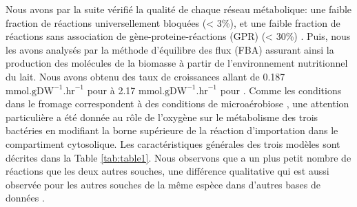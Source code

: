 Nous avons par la suite vérifié la qualité de chaque réseau métabolique: une faible fraction de réactions universellement bloquées (< 3\%), et une faible fraction de réactions sans association de gène-proteine-réactions (GPR) (< 30\%) \citep{Lieven.2020}. Puis, nous les avons analysés par la méthode d'équilibre des flux (FBA) \citep{Palsson1994,Orth2010} assurant ainsi la production des molécules de la biomasse à partir de l'environnement nutritionnel du lait. Nous avons obtenu des taux de croissances allant de 0.187 $\text{mmol.gDW}^{-1}\text{.hr}^{-1}$ pour \freud à 2.17 $\text{mmol.gDW}^{-1}\text{.hr}^{-1}$ pour \lactis. Comme les conditions dans le fromage correspondent à des conditions de microaérobiose \citep{Miyoshi2003}, une attention particulière a été donnée au rôle de l'oxygène sur le métabolisme des trois bactéries en modifiant la borne supérieure de la réaction d'importation dans le compartiment cytosolique. Les caractéristiques générales des trois modèles sont décrites dans la Table \ref{tab:table1}. Nous observons que \lactis a un plus petit nombre de réactions que les deux autres souches, une différence qualitative qui est aussi observée pour les autres souches de la même espèce dans d'autres bases de données \citep{Noronha.2018}.\\


